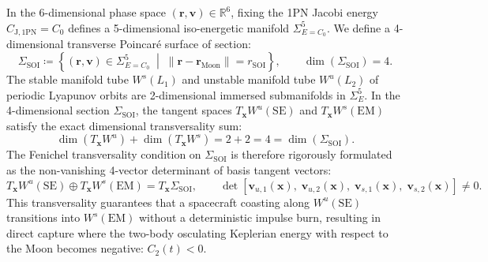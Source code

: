 \documentclass[11pt,a4paper,reqno]{article}
\theoremstyle{plain}
\theoremstyle{definition}
\theoremstyle{remark}
\numberwithin{equation}{section}
\begin{document}
In the 6-dimensional phase space $(\bm{r}, \bm{v}) \in \mathbb{R}^6$, fixing the 1PN Jacobi energy $C_{\mathrm{J, 1PN}} = C_0$ defines a 5-dimensional iso-energetic manifold $\Sigma_{E=C_0}^5$. We define a 4-dimensional transverse Poincaré surface of section:
\begin{equation}
  \Sigma_{\mathrm{SOI}} \coloneqq \left\{ (\bm{r}, \bm{v}) \in \Sigma_{E=C_0}^5 \;\middle|\; \|\bm{r} - \bm{r}_{\mathrm{Moon}}\| = r_{\mathrm{SOI}} \right\}, \qquad \dim(\Sigma_{\mathrm{SOI}}) = 4.
\end{equation}
The stable manifold tube $W^s(L_1)$ and unstable manifold tube $W^u(L_2)$ of periodic Lyapunov orbits are 2-dimensional immersed submanifolds in $\Sigma_E^5$. In the 4-dimensional section $\Sigma_{\mathrm{SOI}}$, the tangent spaces $T_{\bm{x}} W^u(\mathrm{SE})$ and $T_{\bm{x}} W^s(\mathrm{EM})$ satisfy the exact dimensional transversality sum:
\begin{equation}
  \dim(T_{\bm{x}} W^u) + \dim(T_{\bm{x}} W^s) = 2 + 2 = 4 = \dim(\Sigma_{\mathrm{SOI}}).
\end{equation}
The Fenichel transversality condition on $\Sigma_{\mathrm{SOI}}$ is therefore rigorously formulated as the non-vanishing 4-vector determinant of basis tangent vectors:
\begin{equation}
  T_{\bm{x}} W^u(\mathrm{SE}) \oplus T_{\bm{x}} W^s(\mathrm{EM}) = T_{\bm{x}} \Sigma_{\mathrm{SOI}}, \qquad \det\left[ \bm{v}_{u,1}(\bm{x}), \; \bm{v}_{u,2}(\bm{x}), \; \bm{v}_{s,1}(\bm{x}), \; \bm{v}_{s,2}(\bm{x}) \right] \ne 0.
  \label{eq:wsb_transversality_4d}
\end{equation}
This transversality guarantees that a spacecraft coasting along $W^u(\mathrm{SE})$ transitions into $W^s(\mathrm{EM})$ without a deterministic impulse burn, resulting in direct capture where the two-body osculating Keplerian energy with respect to the Moon becomes negative: $C_2(t) < 0$.
\end{document}
